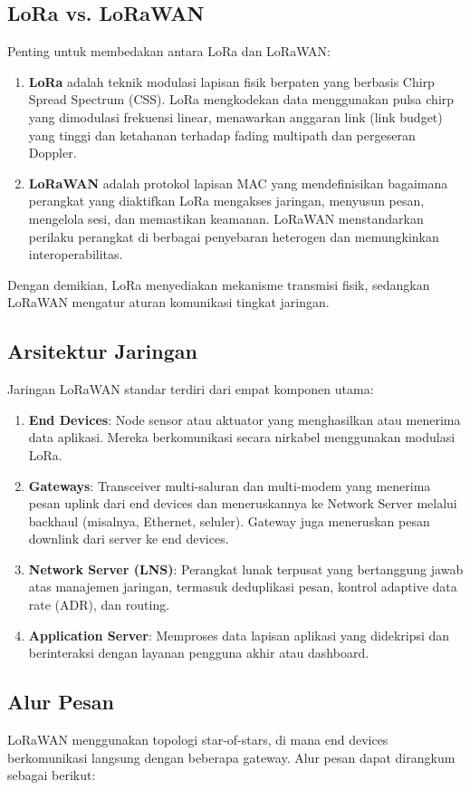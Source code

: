 \subsection{LoRa vs. LoRaWAN}
Penting untuk membedakan antara LoRa dan LoRaWAN:
\begin{enumerate}
    \item \textbf{LoRa} adalah teknik modulasi lapisan fisik berpaten yang berbasis Chirp Spread Spectrum (CSS). LoRa mengkodekan data menggunakan pulsa chirp yang dimodulasi frekuensi linear, menawarkan anggaran link (link budget) yang tinggi dan ketahanan terhadap fading multipath dan pergeseran Doppler.
    \item \textbf{LoRaWAN} adalah protokol lapisan MAC yang mendefinisikan bagaimana perangkat yang diaktifkan LoRa mengakses jaringan, menyusun pesan, mengelola sesi, dan memastikan keamanan. LoRaWAN menstandarkan perilaku perangkat di berbagai penyebaran heterogen dan memungkinkan interoperabilitas.
\end{enumerate}
Dengan demikian, LoRa menyediakan mekanisme transmisi fisik, sedangkan LoRaWAN mengatur aturan komunikasi tingkat jaringan.
\subsection{Arsitektur Jaringan}
Jaringan LoRaWAN standar terdiri dari empat komponen utama:
\begin{enumerate}
    \item \textbf{End Devices}: Node sensor atau aktuator yang menghasilkan atau menerima data aplikasi. Mereka berkomunikasi secara nirkabel menggunakan modulasi LoRa.
    \item \textbf{Gateways}: Transceiver multi-saluran dan multi-modem yang menerima pesan uplink dari end devices dan meneruskannya ke Network Server melalui backhaul (misalnya, Ethernet, seluler). Gateway juga meneruskan pesan downlink dari server ke end devices.
    \item \textbf{Network Server (LNS)}: Perangkat lunak terpusat yang bertanggung jawab atas manajemen jaringan, termasuk deduplikasi pesan, kontrol adaptive data rate (ADR), dan routing.
    \item \textbf{Application Server}: Memproses data lapisan aplikasi yang didekripsi dan berinteraksi dengan layanan pengguna akhir atau dashboard.
\end{enumerate}
\subsection{Alur Pesan}
LoRaWAN menggunakan topologi star-of-stars, di mana end devices berkomunikasi langsung dengan beberapa gateway. Alur pesan dapat dirangkum sebagai berikut:
